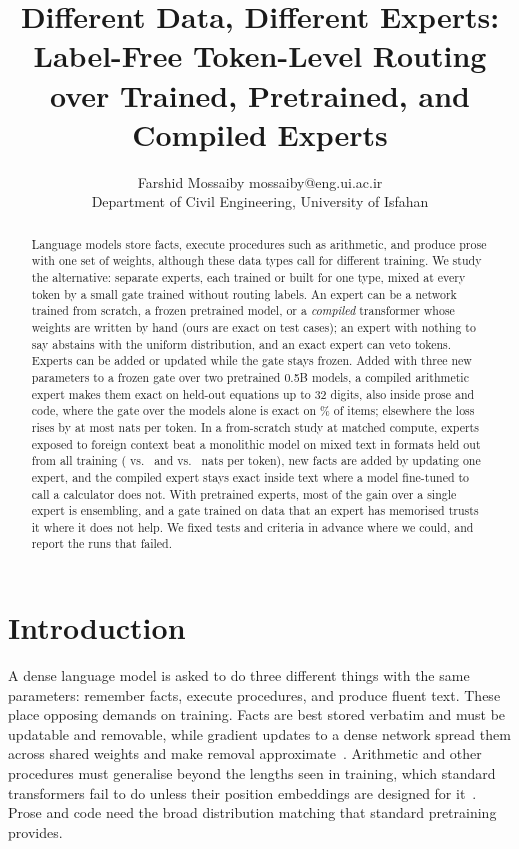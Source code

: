 \documentclass[10pt]{article}
\title{Different Data, Different Experts: Label-Free Token-Level Routing over Trained,
Pretrained, and Compiled Experts}
\author{\name Farshid Mossaiby \email mossaiby@eng.ui.ac.ir \\
      \addr Department of Civil Engineering, University of Isfahan}
\begin{document}
\maketitle

\begin{abstract}
Language models store facts, execute procedures such as arithmetic, and produce prose with one
set of weights, although these data types call for different training. We study the
alternative: separate experts, each trained or built for one type, mixed at every token by a
small gate trained without routing labels. An expert can be a network trained from scratch, a
frozen pretrained model, or a \emph{compiled} transformer whose weights are written by hand
(ours are exact on \resTrackACorrectnessCases{} test cases); an expert with nothing to say
abstains with the uniform distribution, and an exact expert can veto tokens. Experts can be
added or updated while the gate stays frozen. Added with three new parameters to a frozen gate
over two pretrained 0.5B models, a compiled arithmetic expert makes them exact on held-out
equations up to 32 digits, also inside prose and code, where the gate over the models alone is
exact on \resTrackBCircInTextGatePct\% of items; elsewhere the loss rises by at most
\resTrackBCircCostMax{} nats per token. In a from-scratch study at matched compute, experts
exposed to foreign context beat a monolithic model on mixed text in formats held out from all
training (\resTrackCMixedInlineVaried{} vs.\ \resTrackCMixedInlineMonoS{} and
\resTrackCMixedMarkedVaried{} vs.\ \resTrackCMixedMarkedMonoS{} nats per token), new facts are
added by updating one expert, and the compiled expert stays exact inside text where a model
fine-tuned to call a calculator does not. With pretrained experts, most of the gain over a
single expert is ensembling, and a gate trained on data that an expert has memorised trusts it
where it does not help. We fixed tests and criteria in advance where we could, and report the
runs that failed.
\end{abstract}

\section{Introduction}
\label{sec:intro}

A dense language model is asked to do three different things with the same parameters:
remember facts, execute procedures, and produce fluent text. These place opposing demands on
training. Facts are best stored verbatim and must be updatable and removable, while gradient
updates to a dense network spread them across shared weights and make removal
approximate~\citep{meng2022rome}. Arithmetic and other procedures must generalise beyond the
lengths seen in training, which standard transformers fail to do unless their position
embeddings are designed for it~\citep{mcleish2024abacus}.
Prose and code need the broad distribution matching that standard pretraining provides.
\end{document}

